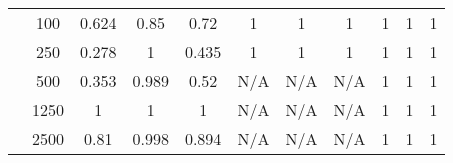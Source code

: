 \begin{table*}[]
{\begin{tabular}{ccccccccccc}
			\multicolumn{1}{|c|}{}                                            & \multicolumn{1}{c|}{100}           & \multicolumn{1}{c|}{0.624}                   & \multicolumn{1}{c|}{0.85}                 & \multicolumn{1}{c|}{0.72}             & \multicolumn{1}{c|}{1}                        & \multicolumn{1}{c|}{1}                     & \multicolumn{1}{c|}{1}                 & \multicolumn{1}{c|}{1}                      & \multicolumn{1}{c|}{1}                   & \multicolumn{1}{c|}{1}               \\ \cline{2-11}
			\multicolumn{1}{|c|}{}                                            & \multicolumn{1}{c|}{250}           & \multicolumn{1}{c|}{0.278}                   & \multicolumn{1}{c|}{1}                    & \multicolumn{1}{c|}{0.435}            & \multicolumn{1}{c|}{1}                        & \multicolumn{1}{c|}{1}                     & \multicolumn{1}{c|}{1}                 & \multicolumn{1}{c|}{1}                      & \multicolumn{1}{c|}{1}                   & \multicolumn{1}{c|}{1}               \\ \cline{2-11}
			\multicolumn{1}{|c|}{}                                            & \multicolumn{1}{c|}{500}           & \multicolumn{1}{c|}{0.353}                   & \multicolumn{1}{c|}{0.989}                & \multicolumn{1}{c|}{0.52}             & \multicolumn{1}{c|}{N/A}                      & \multicolumn{1}{c|}{N/A}                   & \multicolumn{1}{c|}{N/A}               & \multicolumn{1}{c|}{1}                      & \multicolumn{1}{c|}{1}                   & \multicolumn{1}{c|}{1}               \\ \cline{2-11}
			\multicolumn{1}{|c|}{}                                            & \multicolumn{1}{c|}{1250}          & \multicolumn{1}{c|}{1}                       & \multicolumn{1}{c|}{1}                    & \multicolumn{1}{c|}{1}                & \multicolumn{1}{c|}{N/A}                        & \multicolumn{1}{c|}{N/A}                     & \multicolumn{1}{c|}{N/A}                 & \multicolumn{1}{c|}{1}                      & \multicolumn{1}{c|}{1}                   & \multicolumn{1}{c|}{1}               \\ \cline{2-11}
			\multicolumn{1}{|c|}{}                                            & \multicolumn{1}{c|}{2500}          & \multicolumn{1}{c|}{0.81}                    & \multicolumn{1}{c|}{0.998}                & \multicolumn{1}{c|}{0.894}            & \multicolumn{1}{c|}{N/A}                        & \multicolumn{1}{c|}{N/A}                     & \multicolumn{1}{c|}{N/A}                 & \multicolumn{1}{c|}{1}                      & \multicolumn{1}{c|}{1}                   & \multicolumn{1}{c|}{1}               \\ \hline

\end{tabular}}
\end{table*}
